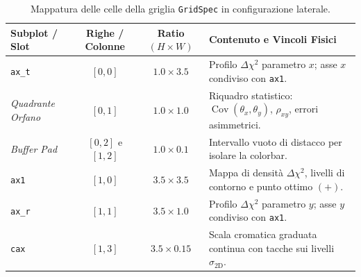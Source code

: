 \documentclass[11pt,a4paper]{article}
\begin{document}
\begin{table}[htbp]
\centering
\small
\begin{tabularx}{\textwidth}{l c c X}
\toprule
\textbf{Subplot / Slot} & \textbf{Righe / Colonne} & \textbf{Ratio $(H \times W)$} & \textbf{Contenuto e Vincoli Fisici} \\
\midrule
\texttt{ax\_t} & $[0, 0]$ & $1.0 \times 3.5$ & Profilo $\Delta\chi^2$ parametro $x$; asse $x$ condiviso con \texttt{ax1}. \\
\emph{Quadrante Orfano} & $[0, 1]$ & $1.0 \times 1.0$ & Riquadro statistico: $\operatorname{Cov}(\theta_x, \theta_y)$, $\rho_{xy}$, errori asimmetrici. \\
\emph{Buffer Pad} & $[0, 2]$ e $[1, 2]$ & $1.0 \times 0.1$ & Intervallo vuoto di distacco per isolare la colorbar. \\
\texttt{ax1} & $[1, 0]$ & $3.5 \times 3.5$ & Mappa di densità $\Delta\chi^2$, livelli di contorno e punto ottimo $(+)$. \\
\texttt{ax\_r} & $[1, 1]$ & $3.5 \times 1.0$ & Profilo $\Delta\chi^2$ parametro $y$; asse $y$ condiviso con \texttt{ax1}. \\
\texttt{cax} & $[1, 3]$ & $3.5 \times 0.15$ & Scala cromatica graduata continua con tacche sui livelli $\sigma_{2\mathrm{D}}$. \\
\bottomrule
\end{tabularx}
\caption{Mappatura delle celle della griglia \texttt{GridSpec} in configurazione laterale.}
\end{table}
\end{document}
